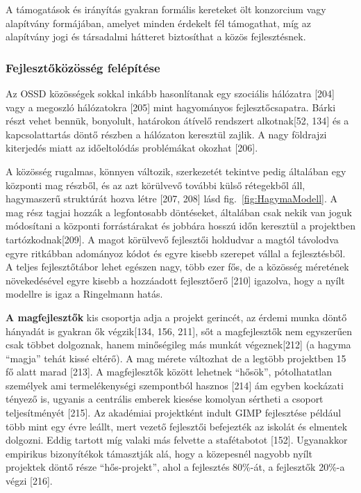 \documentclass[12pt,magyar,a4paper,oneside]{scrreprt}
\begin{document}
A támogatások és irányítás gyakran formális kereteket ölt konzorcium
vagy alapítvány formájában, amelyet minden érdekelt fél támogathat, míg
az alapítvány jogi és társadalmi hátteret biztosíthat a közös
fejlesztésnek.

\hypertarget{fejlesztux151kuxf6zuxf6ssuxe9g-feluxe9puxedtuxe9se}{%
\subsubsection{Fejlesztőközösség
felépítése}\label{fejlesztux151kuxf6zuxf6ssuxe9g-feluxe9puxedtuxe9se}}

Az OSSD közösségek sokkal inkább hasonlítanak egy szociális hálózatra
{[}204{]} vagy a megoszló hálózatokra {[}205{]} mint hagyományos
fejlesztőcsapatra. Bárki részt vehet bennük, bonyolult, határokon
átívelő rendszert alkotnak{[}52, 134{]} és a kapcsolattartás döntő
részben a hálózaton keresztül zajlik. A nagy földrajzi kiterjedés miatt
az időeltolódás problémákat okozhat {[}206{]}.

A közösség rugalmas, könnyen változik, szerkezetét tekintve pedig
általában egy központi mag részből, és az azt körülvevő további külső
rétegekből áll, hagymaszerű struktúrát hozva létre {[}207, 208{]} lásd
fig.~\ref{fig:HagymaModell}. A mag rész tagjai hozzák a legfontosabb
döntéseket, általában csak nekik van joguk módosítani a központi
forrástárakat és jobbára hosszú időn keresztül a projektben
tartózkodnak{[}209{]}. A magot körülvevő fejlesztői holdudvar a magtól
távolodva egyre ritkábban adományoz kódot és egyre kisebb szerepet
vállal a fejlesztésből. A teljes fejlesztőtábor lehet egészen nagy, több
ezer fős, de a közösség méretének növekedésével egyre kisebb a
hozzáadott fejlesztőerő {[}210{]} igazolva, hogy a nyílt modellre is
igaz a Ringelmann hatás.

\textbf{A magfejlesztők} kis csoportja adja a projekt gerincét, az
érdemi munka döntő hányadát is gyakran ők végzik{[}134, 156, 211{]}, sőt
a magfejlesztők nem egyszerűen csak többet dolgoznak, hanem minőségileg
más munkát végeznek{[}212{]} (a hagyma ``magja'' tehát kissé eltérő). A
mag mérete változhat de a legtöbb projektben 15 fő alatt marad
{[}213{]}. A magfejlesztők között lehetnek ``hősök'', pótolhatatlan
személyek ami termelékenységi szempontból hasznos {[}214{]} ám egyben
kockázati tényező is, ugyanis a centrális emberek kiesése komolyan
sértheti a csoport teljesítményét {[}215{]}. Az akadémiai projektként
indult GIMP fejlesztése például több mint egy évre leállt, mert vezető
fejlesztői befejezték az iskolát és elmentek dolgozni. Eddig tartott míg
valaki más felvette a stafétabotot {[}152{]}. Ugyanakkor empirikus
bizonyítékok támasztják alá, hogy a közepesnél nagyobb nyílt projektek
döntő része ``hős-projekt'', ahol a fejlesztés 80\%-át, a fejlesztők
20\%-a végzi {[}216{]}.
\end{document}
